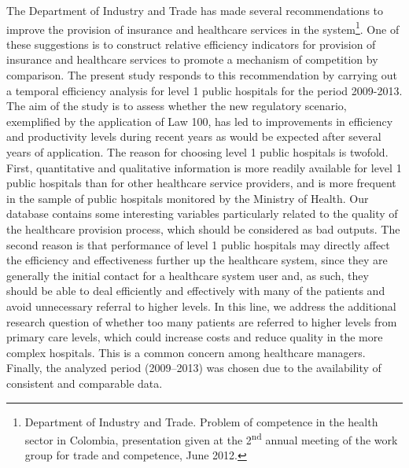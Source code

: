 \documentclass[11pt,a4paper,oneside]{article}
\begin{document}
The Department of Industry and Trade has made several recommendations to improve the provision of insurance and healthcare services in the system\footnote{Department of Industry and Trade. Problem of competence in the health sector in Colombia, presentation given at the 2\textsuperscript{nd} annual meeting of the work group for trade and competence, June 2012.}. One of these suggestions is to construct relative efficiency indicators for provision of insurance and healthcare services to promote a mechanism of competition by comparison. The present study responds to this recommendation by carrying out a temporal efficiency analysis for level 1 public hospitals for the period 2009-2013. The aim of the study is to assess whether the new regulatory scenario, exemplified by the application of Law 100, has led to improvements in efficiency and productivity levels during recent years as would be expected after several years of application. The reason for choosing level 1 public hospitals is twofold. First, quantitative and qualitative information is more readily available for level 1 public hospitals than for other healthcare service providers, and is more frequent in the sample of public hospitals monitored by the Ministry of Health. Our database contains some interesting variables particularly related to the quality of the healthcare provision process, which should be considered as bad outputs. The second reason is that performance of level 1 public hospitals may directly affect the efficiency and effectiveness further up the healthcare system, since they are generally the initial contact for a healthcare system user and, as such, they should be able to deal efficiently and effectively with many of the patients and avoid unnecessary referral to higher levels. In this line, we address the additional research question of whether too many patients are referred to higher levels from primary care levels, which could increase costs and reduce quality in the more complex hospitals. This is a common concern among healthcare managers. Finally, the analyzed period (2009--2013) was chosen due to the availability of consistent and comparable data.
\end{document}
